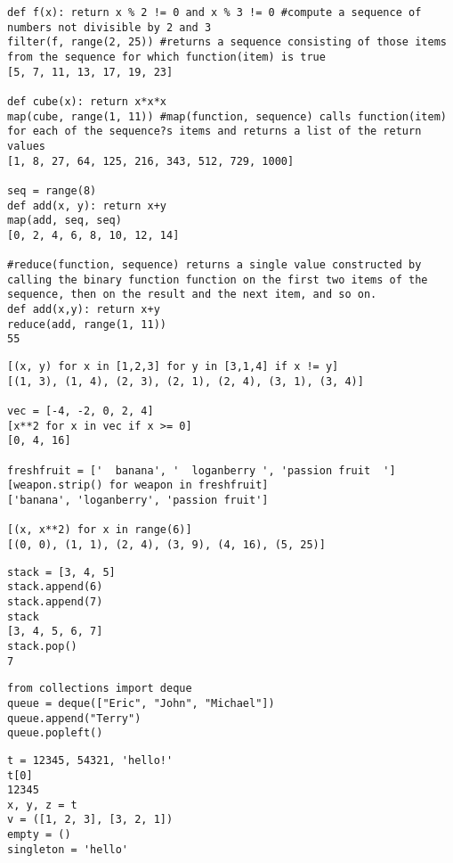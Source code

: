 \documentclass[9pt]{amsart}
\begin{document}
\begin{multicols}{2}
\begin{lstlisting}
def f(x): return x % 2 != 0 and x % 3 != 0 #compute a sequence of numbers not divisible by 2 and 3
filter(f, range(2, 25)) #returns a sequence consisting of those items from the sequence for which function(item) is true
[5, 7, 11, 13, 17, 19, 23]

def cube(x): return x*x*x
map(cube, range(1, 11)) #map(function, sequence) calls function(item) for each of the sequence?s items and returns a list of the return values
[1, 8, 27, 64, 125, 216, 343, 512, 729, 1000]

seq = range(8)
def add(x, y): return x+y
map(add, seq, seq)
[0, 2, 4, 6, 8, 10, 12, 14]

#reduce(function, sequence) returns a single value constructed by calling the binary function function on the first two items of the sequence, then on the result and the next item, and so on.
def add(x,y): return x+y
reduce(add, range(1, 11))
55
\end{lstlisting}

\noindent {\textcolor {blue} {\em List Comprehension}} 

\begin{lstlisting}
[(x, y) for x in [1,2,3] for y in [3,1,4] if x != y]
[(1, 3), (1, 4), (2, 3), (2, 1), (2, 4), (3, 1), (3, 4)]

vec = [-4, -2, 0, 2, 4]
[x**2 for x in vec if x >= 0]
[0, 4, 16]

freshfruit = ['  banana', '  loganberry ', 'passion fruit  ']
[weapon.strip() for weapon in freshfruit]
['banana', 'loganberry', 'passion fruit']

[(x, x**2) for x in range(6)]
[(0, 0), (1, 1), (2, 4), (3, 9), (4, 16), (5, 25)]
\end{lstlisting}

\noindent {\textcolor {blue} {\em Using Lists as Stacks}}
\begin{lstlisting}
stack = [3, 4, 5]
stack.append(6)
stack.append(7)
stack
[3, 4, 5, 6, 7]
stack.pop()
7
\end{lstlisting}

\noindent {\textcolor {blue} {\em Using Lists as Queue}}

\begin{lstlisting}
from collections import deque
queue = deque(["Eric", "John", "Michael"])
queue.append("Terry")
queue.popleft()
\end{lstlisting}

\noindent {\textcolor {blue} {\em Tuples}}
\begin{lstlisting}
t = 12345, 54321, 'hello!'
t[0]
12345
x, y, z = t
v = ([1, 2, 3], [3, 2, 1])
empty = ()
singleton = 'hello'
\end{lstlisting}


\end{multicols}
\end{document}
